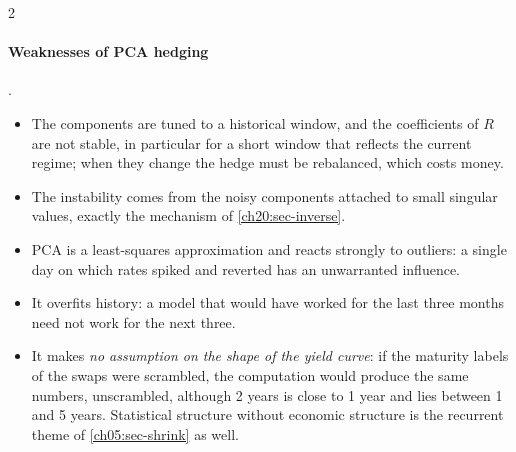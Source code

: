 \begin{paracol}{2}
\paragraph{Weaknesses of PCA hedging} .
\begin{itemize}
  \item The components are tuned to a historical window, and the coefficients of $R$ are not
      stable, in particular for a short window that reflects the current regime; when they change the hedge must be rebalanced, which costs money.
  \item The instability comes from the noisy components attached to
      small singular values, exactly the mechanism of \cref{ch20:sec-inverse}.
  \item PCA is a least-squares approximation and reacts strongly to outliers: a single day on which rates spiked and reverted has an unwarranted influence.
  \item It overfits history: a model that would have worked for the last three months need not work for the next three.
  \item It makes \emph{no assumption on the shape of the yield curve}: if
      the maturity labels of the swaps were scrambled, the computation would produce the same numbers, unscrambled, although 2 years is close to 1 year and lies between 1 and 5 years. Statistical structure
      without economic structure is the recurrent theme of \cref{ch05:sec-shrink} as well.
\end{itemize}


\end{paracol}
